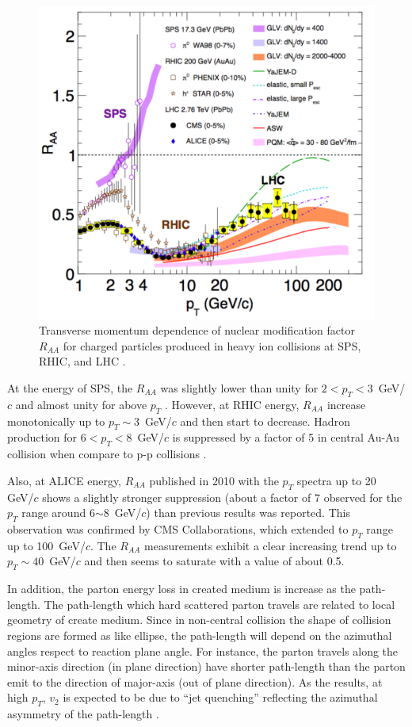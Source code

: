 \begin{figure}[!t]
\centerline{\includegraphics[width=12.0cm]{figures/raa}}
\caption{ Transverse momentum dependence of nuclear modification factor $R_{AA}$ for charged particles produced in heavy ion collisions at SPS, RHIC, and LHC \cite{Roland201470}.} 
\label{fig:RAA}
\end{figure}

    At the energy of SPS, the $R_{AA}$ was slightly lower than unity for $2 < p_T < 3$~GeV/$c$ and almost unity for above $p_T$ \cite{Aggarwaletal.2002}.   However, at RHIC energy, $R_{AA}$ increase monotonically up to $p_T \sim 3$~GeV/$c$ and then start to decrease. Hadron production for $6 < p_T < 8$~GeV/$c$ is suppressed by a factor of 5 in central Au-Au collision when compare to p-p collisions \cite{PhysRevLett.101.232301, PhysRevLett.91.172302}.
    
   Also, at ALICE energy, $R_{AA}$ published in 2010 with the $p_T$ spectra up to 20 GeV/$c$ shows a slightly stronger suppression (about a factor of 7 observed for the $p_T$ range around 6$\sim$8~GeV/$c$) than previous results was reported.  This observation was confirmed by CMS Collaborations, which extended to $p_T$ range up to 100~GeV/$c$. The $R_{AA}$ measurements exhibit a clear increasing trend up to $p_T \sim 40$~GeV/$c$ and then seems to saturate with a value of about 0.5. 
   
   
    In addition, the parton energy loss in created medium is increase as the path-length. The path-length which hard scattered parton travels are related to local geometry of create medium. Since in non-central collision the shape of collision regions are formed as like ellipse, the path-length will depend on the azimuthal angles respect to reaction plane angle. For instance, the parton travels along the minor-axis direction (in plane direction) have shorter path-length than the parton emit to the direction of major-axis (out of plane direction). As the results, at high $p_T$, $v_2$ is expected to be due to ``jet quenching'' reflecting the azimuthal asymmetry of the path-length \cite{Christiansen:2016uaq}.
    
